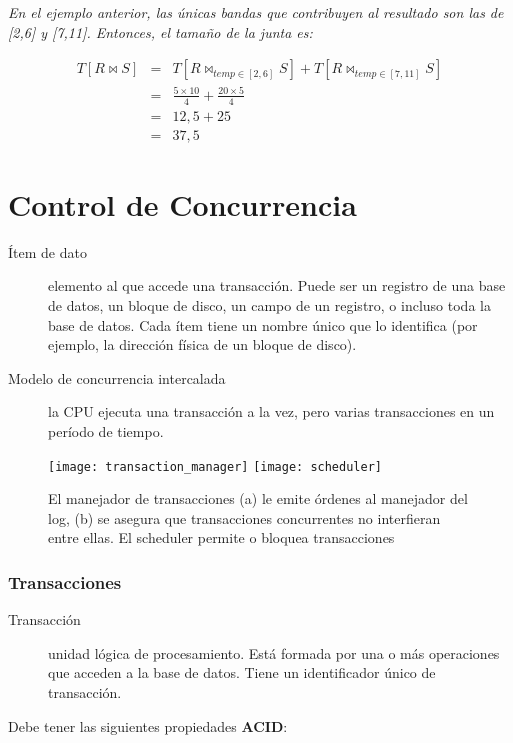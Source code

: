 \documentclass[a4paper, twoside]{article}
\begin{document}
\emph{En el ejemplo anterior, las únicas bandas que contribuyen al resultado son las de {[}2,6{]} y {[}7,11{]}. Entonces, el tamaño de la junta es:}

\begin{eqnarray*}
	T \left[ R \bowtie S \right] & = & T \left[ R \bowtie_{temp \in[2,6]} S \right] + T \left[ R \bowtie_{temp \in[7,11]} S \right]\\
	 & = & \frac{5\times10}{4}+\frac{20\times5}{4}\\
	 & = & 12,5+25\\
	 & = & 37,5
\end{eqnarray*}

\newpage
\part{Control de Concurrencia}
\begin{description}
	\item[Ítem de dato] elemento al que accede una transacción. Puede ser un registro de una base de datos, un bloque de disco, un campo de un registro, o incluso toda la base de datos. Cada ítem tiene un nombre único que lo identifica (por ejemplo, la dirección física de un bloque de disco). 
	\item[Modelo de concurrencia intercalada] la CPU ejecuta una transacción a la vez, pero varias transacciones en un período de tiempo.
\end{description}

\begin{figure}[H]
	\centering
	\texttt{[image: transaction\_manager]}
	\texttt{[image: scheduler]}
	\caption{El manejador de transacciones (a) le emite órdenes al manejador del log, (b) se asegura que transacciones concurrentes no interfieran entre ellas. El scheduler permite o bloquea transacciones}
\end{figure}

\section{Transacciones}
\begin{description}
\item [{Transacción}] unidad lógica de procesamiento. Está formada por
una o más operaciones que acceden a la base de datos. Tiene un identificador
único de transacción. 
\end{description}

Debe tener las siguientes propiedades \textbf{ACID}:
\end{document}
